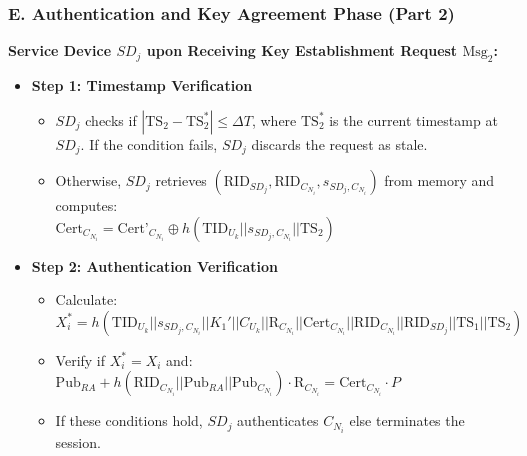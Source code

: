 \documentclass[9pt,handout]{beamer}
\begin{document}
\begin{frame}
    \frametitle{E. Authentication and Key Agreement Phase (Part 2)}

    \textbf{Service Device \( SD_j \) upon Receiving Key Establishment Request \( \text{Msg}_2 \):}

    \begin{itemize}
        \item \textbf{Step 1: Timestamp Verification}
        \begin{itemize}
            \item \( SD_j \) checks if \( |\text{TS}_2 - \text{TS}^*_2| \leq \Delta T \), where \( \text{TS}^*_2 \) is the current timestamp at \( SD_j \). If the condition fails, \( SD_j \) discards the request as stale.
            \item Otherwise, \( SD_j \) retrieves \( (\text{RID}_{SD_j}, \text{RID}_{C_{N_i}}, s_{SD_j,C_{N_i}}) \) from memory and computes:\\
            \(
                \text{Cert}_{C_{N_i}} = \text{Cert'}_{C_{N_i}} \oplus h(\text{TID}_{U_k} || s_{SD_j,C_{N_i}} || \text{TS}_2)
            \)
        \end{itemize}

        \item \textbf{Step 2: Authentication Verification}
        \begin{itemize}
            \item Calculate:
            \(
                X^*_i = h(\text{TID}_{U_k} || s_{SD_j,C_{N_i}} || K_1' || C_{U_k} || \text{R}_{C_{N_i}} || \text{Cert}_{C_{N_i}} || \text{RID}_{C_{N_i}} || \text{RID}_{SD_j} || \text{TS}_1 || \text{TS}_2)
            \)
            \item Verify if \( X^*_i = X_i \) and:\\
            \(
                \text{Pub}_{RA} + h(\text{RID}_{C_{N_i}} || \text{Pub}_{RA} || \text{Pub}_{C_{N_i}}) \cdot \text{R}_{C_{N_i}} = \text{Cert}_{C_{N_i}} \cdot P
            \)
            \item If these conditions hold, \( SD_j \) authenticates \( C_{N_i} \) else terminates the session.
        \end{itemize}

        
    \end{itemize}

\end{frame}
\end{document}
